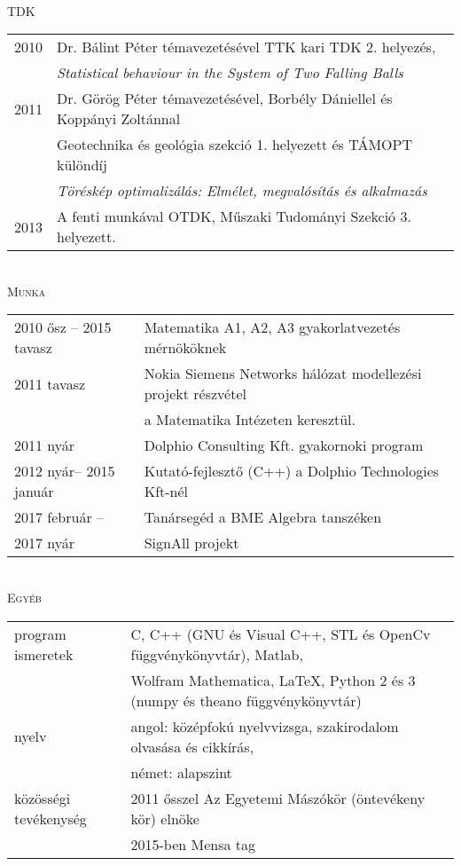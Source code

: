 \documentclass[12pt]{article}
\begin{document}
 { \ }\\ 
  \textsc{TDK}
 \vspace{0.3cm}
 \\
        \begin{tabular}{p{3cm}l}
		2010& Dr. Bálint Péter témavezetésével TTK kari TDK 2. helyezés, \\
            & \emph{Statistical behaviour in the
System of Two Falling Balls}\\
		2011& Dr. Görög Péter témavezetésével, Borbély Dániellel és Koppányi Zoltánnal\\
            & Geotechnika és geológia szekció 1. helyezett és TÁMOPT különdíj\\
            & \emph{Töréskép optimalizálás: Elmélet, megvalósítás és alkalmazás}\\
        2013& A fenti munkával OTDK, Műszaki Tudományi Szekció 3. helyezett.
       \end{tabular}
	\vspace{0.3cm}
 \\
 \textsc{Munka}
 \vspace{0.3cm}
 \\
       \begin{tabular}{p{4cm}l}
	       2010 ősz -- 2015 tavasz & Matematika A1, A2, A3 gyakorlatvezetés mérnököknek\\
           2011 tavasz  & Nokia Siemens Networks hálózat modellezési projekt részvétel\\ & a Matematika Intézeten keresztül. \\
		   2011 nyár    & Dolphio Consulting Kft. gyakornoki program\\
		   2012 nyár-- 2015 január & Kutató-fejlesztő (C++) a Dolphio Technologies Kft-nél \\
           2017 február -- & Tanársegéd a BME Algebra tanszéken \\
           2017 nyár & SignAll projekt
       \end{tabular}
 \vspace{0.3cm}
 \\
 \newpage
  \noindent\textsc{Egyéb}
 \vspace{0.3cm}
 \\
        \begin{tabular}{p{3cm}l}
	       program ismeretek &  C, C++ (GNU és Visual C++, STL és OpenCv függvénykönyvtár), Matlab, \\
                             & Wolfram Mathematica, \LaTeX, Python 2 és 3 (numpy és theano függvénykönyvtár) \\
           nyelv & angol: középfokú nyelvvizsga, szakirodalom olvasása és cikkírás, \\
                 & német: alapszint\\
		   közösségi tevékenység  & 2011 ősszel Az Egyetemi Mászókör (öntevékeny kör) elnöke \\
                                  & 2015-ben Mensa tag
       \end{tabular}
\end{document}
